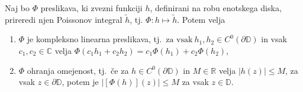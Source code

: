 \documentclass[mat1, tisk]{fmfdelo}
\begin{document}
    \begin{trditev}
       \label{lastpi}
       Naj bo $\Phi$ preslikava, ki zvezni funkciji $h$, definirani na robu enotskega diska, prireredi njen Poissonov integral $\widetilde{h}$, tj. $\Phi : h \mapsto \widetilde{h}$.
       Potem velja
       \begin{enumerate}[label={\alph*)}]
           \item $\Phi$ je kompleksno linearna preslikava, tj.\ $\text{za vsak}~h_1,h_2 \in C^0(\partial \mathbb{D})$ in vsak $c_1,c_2 \in \mathbb{C}$ velja $\Phi(c_1 h_1 + c_2 h_2) = c_1 \Phi(h_1) + c_2 \Phi(h_2)$,
           \item $\Phi$ ohranja omejenost, tj.\ če za $h \in C^0(\partial \mathbb{D})$ in $M \in \mathbb{R}$ velja $|h(z)| \leq M$, za vsak $z \in \partial \mathbb{D}$, potem je $|[\Phi(h)](z)| \leq M$ za vsak $z \in \mathbb{D}$.
       \end{enumerate}
    \end{trditev}
\end{document}
